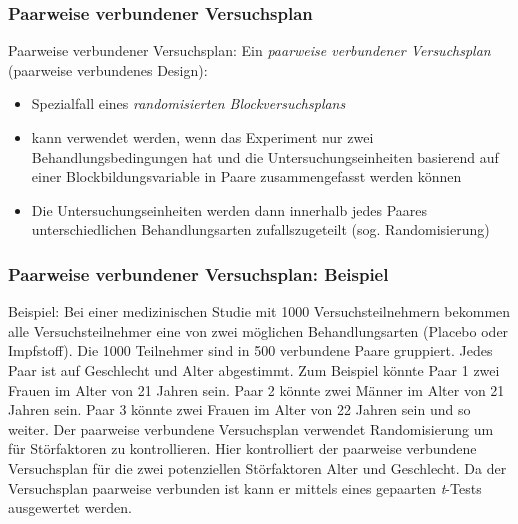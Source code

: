 \documentclass{beamer}
\begin{document}
\begin{frame}
\frametitle{Paarweise verbundener Versuchsplan}

\begin{exampleblock}{Paarweise verbundener Versuchsplan:}
Ein \textit{paarweise verbundener Versuchsplan} (paarweise verbundenes Design):
\begin{itemize}
\item Spezialfall eines \textit{randomisierten Blockversuchsplans}
\item kann verwendet werden, wenn das Experiment nur zwei Behandlungsbedingungen hat und die Untersuchungseinheiten basierend auf einer Blockbildungsvariable in Paare zusammengefasst werden können
\item Die Untersuchungseinheiten werden dann innerhalb jedes Paares unterschiedlichen Behandlungsarten zufallszugeteilt (sog. Randomisierung)
\end{itemize}
\end{exampleblock}
\end{frame}

\begin{frame}
\frametitle{Paarweise verbundener Versuchsplan: Beispiel}
\begin{exampleblock}{Beispiel:}
Bei einer medizinischen Studie mit 1000 Versuchsteilnehmern bekommen alle Versuchsteilnehmer eine von zwei möglichen Behandlungsarten (Placebo oder Impfstoff). Die 1000 Teilnehmer sind in 500 verbundene Paare gruppiert. Jedes Paar ist auf Geschlecht und Alter abgestimmt. Zum Beispiel könnte Paar 1 zwei Frauen im Alter von 21 Jahren sein. Paar 2 könnte zwei Männer im Alter von 21 Jahren sein. Paar 3 könnte zwei Frauen im Alter von 22 Jahren sein und so weiter. Der paarweise verbundene Versuchsplan verwendet Randomisierung um für Störfaktoren zu kontrollieren. Hier kontrolliert der paarweise verbundene Versuchsplan für die zwei potenziellen Störfaktoren Alter und Geschlecht. Da der Versuchsplan paarweise verbunden ist kann er mittels eines gepaarten \textit{t}-Tests ausgewertet werden.
\end{exampleblock}
\end{frame}
\end{document}
